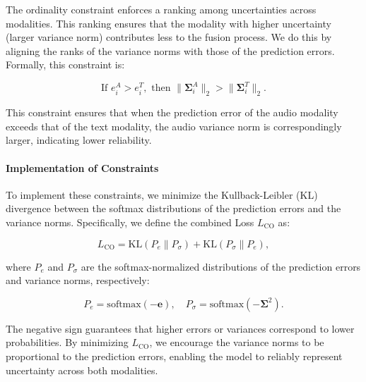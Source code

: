 \documentclass[9pt,a4paper]{rho-class/rho}
\begin{document}
The ordinality constraint enforces a ranking among uncertainties across modalities. This ranking ensures that the modality with higher uncertainty (larger variance norm) contributes less to the fusion process. We do this by aligning the ranks of the variance norms with those of the prediction errors. Formally, this constraint is:

\begin{equation}
    \text{If } e_i^A > e_i^T, \text{ then } \| \boldsymbol{\Sigma}_i^A \|_2 > \| \boldsymbol{\Sigma}_i^T \|_2.
\end{equation}

This constraint ensures that when the prediction error of the audio modality exceeds that of the text modality, the audio variance norm is correspondingly larger, indicating lower reliability.

\paragraph{Implementation of Constraints}

To implement these constraints, we minimize the Kullback-Leibler (KL) divergence between the softmax distributions of the prediction errors and the variance norms. Specifically, we define the combined Loss \( L_{\text{CO}} \) as:

\begin{equation}
    L_{\text{CO}} = \text{KL}( P_e \parallel P_\sigma ) + \text{KL}( P_\sigma \parallel P_e ),
\end{equation}

where \( P_e \) and \( P_\sigma \) are the softmax-normalized distributions of the prediction errors and variance norms, respectively:

\begin{equation}
    P_e = \text{softmax}( -\mathbf{e} ), \quad P_\sigma = \text{softmax}( -\boldsymbol{\Sigma}^2 ).
\end{equation}

The negative sign guarantees that higher errors or variances correspond to lower probabilities. By minimizing \( L_{\text{CO}} \), we encourage the variance norms to be proportional to the prediction errors, enabling the model to reliably represent uncertainty across both modalities.

\end{document}
